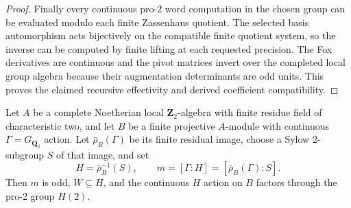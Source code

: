 \begin{proof}
Finally every
continuous pro-$2$
word computation
in the chosen
group can be
evaluated modulo
each finite
Zassenhaus
quotient.
The selected
basis automorphism
acts bijectively
on the compatible
finite quotient
system, so the
inverse can be
computed by
finite lifting
at each requested
precision.
The Fox
derivatives are
continuous and
the pivot matrices
invert over the
completed local
group algebra
because their
augmentation
determinants
are odd units.
This proves the
claimed
recursive effectivity
and derived
coefficient
compatibility.
\end{proof}

\begin{theorem}
\label{thm:dyadic-f135-full-marked-all-residual-completeness}
Let $A$ be a complete
Noetherian local
$\mathbf Z_2$-algebra
with finite residue
field of characteristic
two, and let
$B$ be a finite
projective $A$-module
with continuous
$\Gamma=G_{\mathbf Q_2}$
action.
Let $\bar\rho_B(\Gamma)$
be its finite
residual image,
choose a Sylow
$2$-subgroup
$S$ of that
image, and set
\begin{equation}\label{eq:dyadic-f135-residual-sylow-preimage}
H=\bar\rho_B^{-1}(S),
\qquad
m=[\Gamma:H]
=[\bar\rho_B(\Gamma):S].
\end{equation}
Then $m$ is odd,
$W\subseteq H$,
and the
continuous $H$
action on $B$
factors through
the pro-$2$
group $H(2)$.


\end{theorem}
